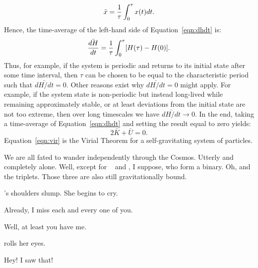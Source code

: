 \documentclass[main.tex]{subfiles}
\begin{document}
\begin{tcolorbox}[sharp corners, colback=blue!30, colframe=blue!80!blue, title=Virial Theorem]
{\begin{equation}
\bar{x} = \frac{1}{\tau}\int_{0}^{\rm \tau} x(t)dt.
\end{equation}
Hence, the time-average of the left-hand side of Equation~\ref{eqn:dhdt} is:
\begin{equation}
\bar{\frac{dH}{dt}} = \frac{1}{\tau}\int_{0}^{\rm \tau} [H(\tau) - H(0)].
\end{equation}
Thus, for example, if the system is periodic and returns to its initial state after some time interval, then $\tau$ can be chosen to be equal to the characteristic period such that $\bar{dH/dt} = 0$.  Other reasons exist why $\bar{dH/dt} = 0$ might apply.  For example, if the system state is non-periodic but instead long-lived while remaining approximately stable, or at least deviations from the initial state are not too extreme, then over long timescales we have $\bar{dH/dt} \rightarrow 0$.  In the end, taking a time-average of Equation~\ref{eqn:dhdt} and setting the result equal to zero yields:
\begin{equation}
2\bar{K} + \bar{U} = 0.
\label{eqn:vir}
\end{equation}
Equation~\ref{eqn:vir} is the Virial Theorem for a self-gravitating system of particles.}
\end{tcolorbox}

\par \Sterope We are all fated to wander independently through the Cosmos.  Utterly and completely alone.  Well, except for \rmmaia~ and \rmmerope, I suppose, who form a binary.  Oh, and the triplets.  Those three are also still gravitationally bound.

\par \nar \rmalcyone's shoulders slump.  She begins to cry.

\par \Alcyone Already, I miss each and every one of you.

\par \Taygete Well, at least you have me.

\par \nar \rmalcyone rolls her eyes.

\par \Taygete Hey!  I saw that!
\end{document}
